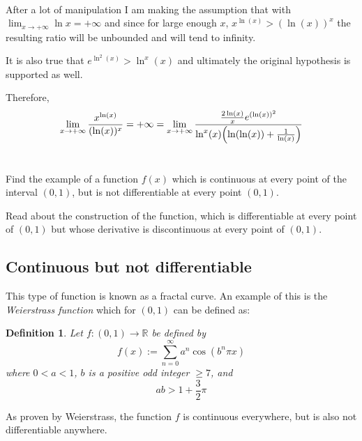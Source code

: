 \documentclass[]{article}
\newcommand{\R}{\mathbb{R}}
\newtheorem{definition}{Definition}
\begin{document}
\begin{align*}
\end{align*}

After a lot of manipulation I am making the assumption that with
$\lim_{x \to + \infty} \ln{x} = + \infty$
and since for large enough $x$, 
$x^{\ln(x)} > (\ln(x))^x$
the resulting ratio will be unbounded and will tend to infinity.

It is also true that
$e^{\ln^2(x)} > \ln^x(x)$
and ultimately the original hypothesis is supported as well.

Therefore, 
\[
    \lim_{x \to + \infty} \frac{x^{\ln(x)}}{(\ln(x))^x} = + \infty 
        = \lim_{x \to + \infty}
            \frac{
                \frac{2 \ln(x)}{x} e^{(\ln(x))^2}
            }{
                \ln^x(x) \qty(\ln(\ln(x))+ \frac{1}{\ln(x)})
            }
\]

\newpage
\section{}
Find the example of a function $f(x)$ which is continuous at every point of the interval $(0,1)$, but is not differentiable at every point $(0,1)$.

Read about the construction of the function, which is differentiable at every point of $(0,1)$ but whose derivative is discontinuous at every point of $(0,1)$.

\subsection*{Continuous but not differentiable}
This type of function is known as a fractal curve. An example of this is the \emph{Weierstrass function} which for $(0,1)$ can be defined as:
\begin{definition}
    Let $f : (0,1) \to \R$ be defined by
    \[
        f(x) := \sum_{n = 0}^{\infty} a^n \cos(b^n \pi x)
    \]
    where $0 < a < 1$,
    $b$ is a positive odd integer $\geq 7$,
    and
    \[
        ab > 1 + \frac{3}{2} \pi
    \]    
\end{definition}
As proven by Weierstrass, the function $f$ is continuous everywhere, but is also not differentiable anywhere.
\end{document}
